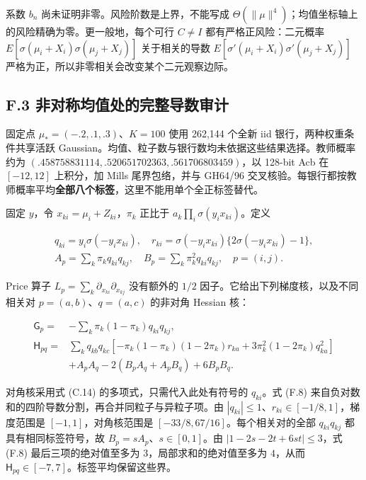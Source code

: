 \documentclass[11pt,a4paper]{article}
\begin{document}
系数 \(b_n\) 尚未证明非零。风险阶数是上界，不能写成
\(\Theta(\|\mu\|^4)\)；均值坐标轴上的风险精确为零。更一般地，每个可行
\(C\ne I\) 都有严格正风险：二元概率
\(E[\sigma(\mu_i+X_i)\sigma(\mu_j+X_j)]\) 关于相关的导数
\(E[\sigma'(\mu_i+X_i)\sigma'(\mu_j+X_j)]\)
严格为正，所以非零相关会改变某个二元观察边际。

\subsection*{F.3
非对称均值处的完整导数审计}\label{f.3-ux975eux5bf9ux79f0ux5747ux503cux5904ux7684ux5b8cux6574ux5bfcux6570ux5ba1ux8ba1}

固定点 \(\mu_*=(-.2,.1,.3)\)、\(K=100\) 使用 262,144 个全新 iid
银行，两种权重条件共享活跃
Gaussian。均值、粒子数与银行数均未依据这些结果选择。教师概率约为
\((.458758831114,.520651702363,.561706803459)\)，以 128-bit Acb 在
\([-12,12]\) 上积分，加 Mills 尾界包络，并与 GH64/96
交叉核验。每银行都按教师概率平均\textbf{全部八个标签}，这里不能用单个全正标签替代。

固定 \(y\)，令 \(x_{ki}=\mu_i+Z_{ki}\)，\(\pi_k\) 正比于
\(a_k\prod_i\sigma(y_ix_{ki})\)。定义

\[
\begin{gathered}
q_{ki}=y_i\sigma(-y_ix_{ki}),\quad
r_{ki}=\sigma(-y_ix_{ki})\{2\sigma(-y_ix_{ki})-1\},\\
A_p=\sum_k\pi_kq_{ki}q_{kj},\quad B_p=\sum_k\pi_k^2q_{ki}q_{kj},\quad p=(i,j).
\end{gathered}
\tag{F.7}
\]

Price 算子 \(L_p=\sum_k\partial_{x_{ki}}\partial_{x_{kj}}\) 没有额外的
\(1/2\) 因子。它给出下列梯度核，以及不同相关对 \(p=(a,b)\)、\(q=(a,c)\)
的非对角 Hessian 核：

\[
\begin{aligned}
\mathsf G_p={}&-\sum_k\pi_k(1-\pi_k)q_{ki}q_{kj},\\
\mathsf H_{pq}={}&\sum_kq_{kb}q_{kc}\left[-\pi_k(1-\pi_k)(1-2\pi_k)r_{ka}
+3\pi_k^2(1-2\pi_k)q_{ka}^2\right]\\
&+A_pA_q-2(B_pA_q+A_pB_q)+6B_pB_q.
\end{aligned}
\tag{F.8}
\]

对角核采用式 (C.14) 的多项式，只需代入此处有符号的 \(q_{ki}\)。式 (F.8)
来自负对数和的四阶导数分割，再合并同粒子与异粒子项。由
\(|q_{ki}|\le1\)、\(r_{ki}\in[-1/8,1]\)，梯度范围是
\([-1,1]\)，对角核范围是 \([-33/8,67/16]\)。每个相关对的全部
\(q_{ki}q_{kj}\) 都具有相同标签符号，故 \(B_p=sA_p\)、\(s\in[0,1]\)。由
\(|1-2s-2t+6st|\le3\)，式 (F.8) 最后三项的绝对值至多为
\(3\)，局部求和的绝对值至多为 \(4\)，从而
\(\mathsf H_{pq}\in[-7,7]\)。标签平均保留这些界。
\end{document}
